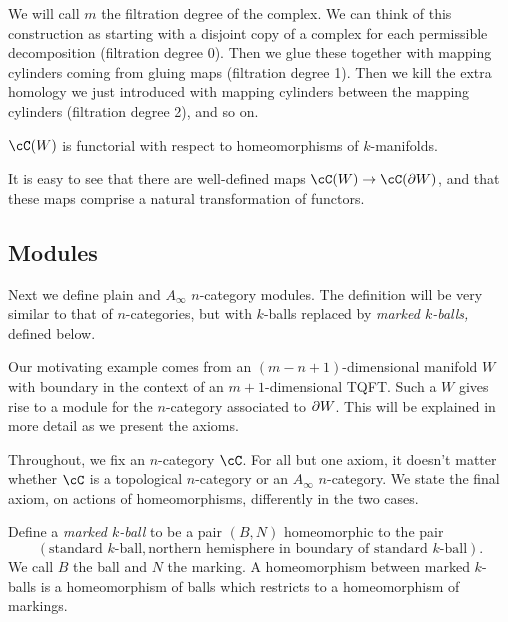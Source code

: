 We will call $m$ the filtration degree of the complex.
We can think of this construction as starting with a disjoint copy of a complex for each
permissible decomposition (filtration degree 0).
Then we glue these together with mapping cylinders coming from gluing maps
(filtration degree 1).
Then we kill the extra homology we just introduced with mapping 
cylinders between the mapping cylinders (filtration degree 2), and so on.

$\cC(W)$ is functorial with respect to homeomorphisms of $k$-manifolds.

It is easy to see that
there are well-defined maps $\cC(W)\to\cC(\bd W)$, and that these maps
comprise a natural transformation of functors.


\subsection{Modules}

Next we define plain and $A_\infty$ $n$-category modules.
The definition will be very similar to that of $n$-categories,
but with $k$-balls replaced by {\it marked $k$-balls,} defined below.

Our motivating example comes from an $(m{-}n{+}1)$-dimensional manifold $W$ with boundary
in the context of an $m{+}1$-dimensional TQFT.
Such a $W$ gives rise to a module for the $n$-category associated to $\partial W$.
This will be explained in more detail as we present the axioms.


Throughout, we fix an $n$-category $\cC$.
For all but one axiom, it doesn't matter whether $\cC$ is a topological $n$-category or an $A_\infty$ $n$-category.
We state the final axiom, on actions of homeomorphisms, differently in the two cases.

Define a {\it marked $k$-ball} to be a pair $(B, N)$ homeomorphic to the pair
$$(\text{standard $k$-ball}, \text{northern hemisphere in boundary of standard $k$-ball}).$$
We call $B$ the ball and $N$ the marking.
A homeomorphism between marked $k$-balls is a homeomorphism of balls which
restricts to a homeomorphism of markings.


